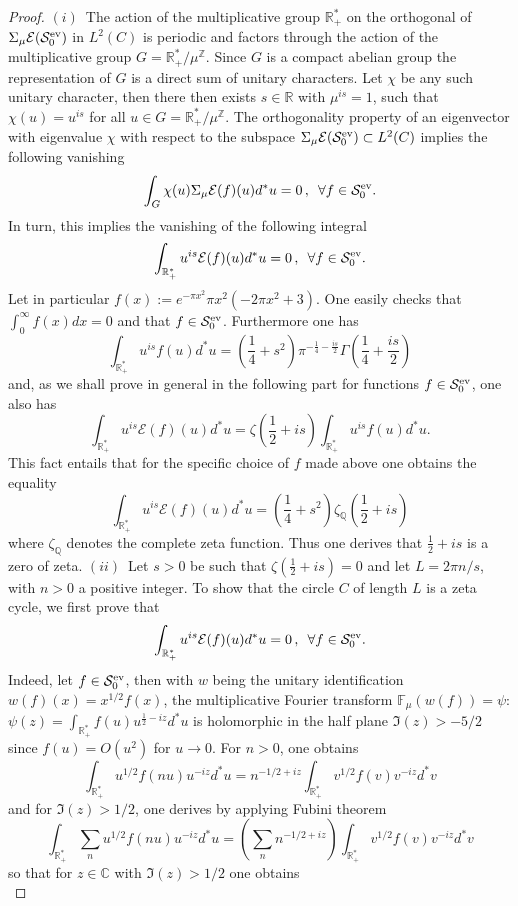 \documentclass[cupthm]{CUP-JNL-JMJ}
\def\C{{\mathbb C}}
\def\F{{\mathbb F}}
\def\Q{{\mathbb Q}}
\def\R{{\mathbb R}}
\def\Z{{\mathbb Z}}
\def\cE{{\mathcal E}}
\def\cS{{\mathcal S}}
\def\fourier{\F}
\def\qqq{\,,\,~\forall}
\def\sr0{{\cS^{\rm ev}_0}}
\numberwithin{equation}{section}
\theoremstyle{cupplain}
\theoremstyle{cupdefinition}
\theoremstyle{cupremark}
\theoremstyle{cupproof}
\newtheorem{proof}{Proof}
\begin{document}
\begin{proof} $(i)$~The action of the multiplicative group $\R_+^*$ on the orthogonal of $\Sigma_\mu \cE(\sr0)$ in $L^2(C)$ is periodic and factors through the action of the multiplicative group $G=\R_+^*/\mu^{\Z}$. Since $G$ is a compact abelian group the representation of $G$ is a direct sum of unitary characters. Let $\chi$ be any such unitary character, then there then exists $s\in \R$ with $\mu^{is}=1$,  such that $\chi(u)=u^{is}$ for all $u\in G=\R_+^*/\mu^{\Z}$. The orthogonality property of an eigenvector with eigenvalue $\chi$ with respect to the subspace $\Sigma_\mu \cE(\sr0)\subset L^2(C)$ implies the following vanishing
$$
\int_G \chi(u)\Sigma_\mu \cE(f)(u)d^*u=0\qqq f\in \sr0{.}
$$
In turn, this  implies  the vanishing of the following integral 
$$
\int_{\R_+^*}u^{is} \cE(f)(u)d^*u=0\qqq f\in \sr0.
$$
Let in particular $f(x):=  e^{-\pi  x^2} \pi x^2 \left(-2 \pi  x^2+3\right)$. One easily checks that $\int_0^{\infty}f(x)dx=0$ and that $f\in \sr0$. Furthermore one has 
$$
\int_{\R_+^*}u^{is} f(u)d^*u=\left(\frac 14 +s^2\right) \pi ^{-\frac{1}{4}-\frac{is}{2}} \Gamma \left(\frac{1}{4}+\frac{is }{2}\right)
$$
and, as we shall prove in general in the following part for functions $f\in \sr0$, one also has 
$$
\int_{\R_+^*}u^{is} \cE(f)(u)d^*u=\zeta(\frac 12+is)\int_{\R_+^*}u^{is} f(u)d^*u.
$$
This fact entails that for the specific choice of $f$ made above one obtains the equality
 $$\int_{\R_+^*}u^{is} \cE(f)(u)d^*u=(\frac 14 +s^2)\zeta_\Q\left(\frac 12+is\right)$$ 
where $\zeta_\Q$ denotes the complete zeta function. Thus  one derives that $\frac 12+is$ is a zero of zeta.\newline
$(ii)$~Let $s>0$ be such that $\zeta(\frac 12+is)=0$ and let $L=2\pi n/s$,  with $n>0$ a positive  integer. To show that the circle $C$ of length $L$ is a zeta cycle, we first prove that  
$$
\int_{\R_+^*}u^{is} \cE(f)(u)d^*u=0\qqq f\in \sr0.
$$
Indeed, let $f\in \sr0$, then with $w$ being the unitary identification $w(f)(x)=x^{1/2}f(x)$,  the multiplicative Fourier transform  $\fourier_\mu(w(f))=\psi$:  
$\psi(z)=\int_{\R_+^*}f(u)u^{\frac 12-iz}d^*u$ is holomorphic in the half plane $\Im(z)>-5/2$ since $f(u)=O(u^2)$ for $u\to 0$. For $n>0$, one obtains
$$
\int_{\R_+^*}u^{1/2}f(nu)u^{-iz}d^*u=n^{-1/2+iz}\int_{\R_+^*}v^{1/2}f(v)v^{-iz}d^*v
$$
and for $\Im(z)>1/2$, one derives by applying Fubini theorem
$$
\int_{\R_+^*}{\sum_n} u^{1/2}f(nu)u^{-iz}d^*u= \left({\sum_n} n^{-1/2+iz}\right)\int_{\R_+^*}v^{1/2}f(v)v^{-iz}d^*v
$$
so that for $z\in\C$ with $\Im(z)>1/2$ one obtains 
\begin{equation}\label{mapEzeta}

\end{equation}
\end{proof}
\end{document}
